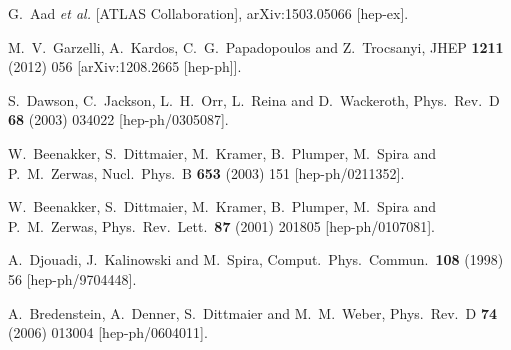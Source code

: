 \documentclass[preprintnumbers,superscriptaddress,nofootinbib,aps,prd,floatfix]{revtex4}
\begin{document}
\begin{thebibliography}{99}
  G.~Aad {\it et al.} [ATLAS Collaboration],
  arXiv:1503.05066 [hep-ex].

  M.~V.~Garzelli, A.~Kardos, C.~G.~Papadopoulos and Z.~Trocsanyi,
  JHEP {\bf 1211} (2012) 056
  [arXiv:1208.2665 [hep-ph]].
  
  S.~Dawson, C.~Jackson, L.~H.~Orr, L.~Reina and D.~Wackeroth,
  Phys.\ Rev.\ D {\bf 68} (2003) 034022
  [hep-ph/0305087].
  
  W.~Beenakker, S.~Dittmaier, M.~Kramer, B.~Plumper, M.~Spira and P.~M.~Zerwas,
  Nucl.\ Phys.\ B {\bf 653} (2003) 151
  [hep-ph/0211352].
  
  W.~Beenakker, S.~Dittmaier, M.~Kramer, B.~Plumper, M.~Spira and P.~M.~Zerwas,
  Phys.\ Rev.\ Lett.\  {\bf 87} (2001) 201805
  [hep-ph/0107081].
  
  A.~Djouadi, J.~Kalinowski and M.~Spira,
  Comput.\ Phys.\ Commun.\  {\bf 108} (1998) 56
  [hep-ph/9704448].
  
  A.~Bredenstein, A.~Denner, S.~Dittmaier and M.~M.~Weber,
  Phys.\ Rev.\ D {\bf 74} (2006) 013004
  [hep-ph/0604011].
  

\end{thebibliography}
\end{document}
